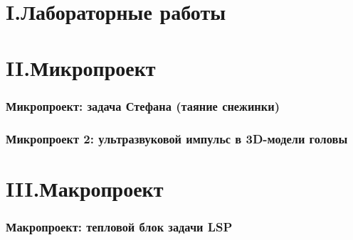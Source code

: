 \documentclass[12pt, a4paper]{article}
\begin{document}



\tableofcontents

\clearpage

\part*{I.\quad Лабораторные работы}
\setcounter{section}{0}


\clearpage


\clearpage


\clearpage

\part*{II.\quad Микропроект}
\setcounter{section}{0}

\section{Микропроект: задача Стефана (таяние снежинки)}

\clearpage

\section{Микропроект 2: ультразвуковой импульс в 3D-модели головы}

\clearpage

\part*{III.\quad Макропроект}
\setcounter{section}{0}

\section{Макропроект: тепловой блок задачи LSP}

\clearpage


\end{document}
